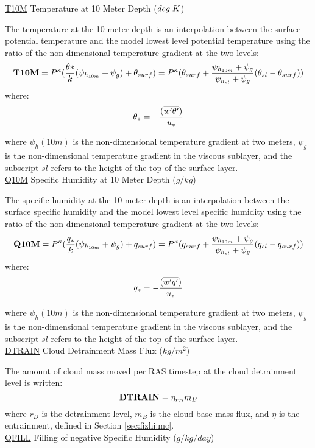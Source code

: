 \noindent
{ \underline {T10M}  Temperature at 10 Meter Depth ($deg \hspace{.1cm} K$) }

\noindent
The temperature at the 10-meter depth is an interpolation between the surface potential 
temperature and the model lowest level potential temperature using the ratio of the 
non-dimensional temperature gradient at the two levels:
\[
{\bf T10M} = P^{\kappa} ({\theta* \over k} ({\psi_{h_{10m}}+\psi_g}) + \theta_{surf} ) = 
P^{\kappa}(\theta_{surf} + { {\psi_{h_{10m}}+\psi_g} \over {{\psi_{h_{sl}}+\psi_g}} }
(\theta_{sl} - \theta_{surf})) 
\]
where:
\[
\theta_* = - { (\overline{w^{\prime}\theta^{\prime}}) \over {u_*} }
\]

\noindent
where $\psi_h(10m)$ is the non-dimensional temperature gradient at two meters, $\psi_g$ is
the non-dimensional temperature gradient in the viscous sublayer, and the subscript
$sl$ refers to the height of the top of the surface layer.
\\
 
\noindent
{ \underline {Q10M}  Specific Humidity at 10 Meter Depth ($g/kg$) }

\noindent
The specific humidity at the 10-meter depth is an interpolation between the surface specific 
humidity and the model lowest level specific humidity using the ratio of the 
non-dimensional temperature gradient at the two levels:
\[
{\bf Q10M} = P^{\kappa} ({q_* \over k} ({\psi_{h_{10m}}+\psi_g}) + q_{surf} ) = 
P^{\kappa}(q_{surf} + { {\psi_{h_{10m}}+\psi_g} \over {{\psi_{h_{sl}}+\psi_g}} }
(q_{sl} - q_{surf})) 
\]
where:
\[
q_* =  - { (\overline{w^{\prime}q^{\prime}}) \over {u_*} }
\]

\noindent
where $\psi_h(10m)$ is the non-dimensional temperature gradient at two meters, $\psi_g$ is
the non-dimensional temperature gradient in the viscous sublayer, and the subscript
$sl$ refers to the height of the top of the surface layer.
\\
 
\noindent
{ \underline {DTRAIN} Cloud Detrainment Mass Flux ($kg/m^2$) } 

The amount of cloud mass moved per RAS timestep at the cloud detrainment level is written:
\[
{\bf DTRAIN} = \eta_{r_D}m_B
\]
\noindent
where $r_D$ is the detrainment level, 
$m_B$ is the cloud base mass flux, and $\eta$
is the entrainment, defined in Section \ref{sec:fizhi:mc}.
\\

\noindent
{ \underline {QFILL}  Filling of negative Specific Humidity ($g/kg/day$) }

